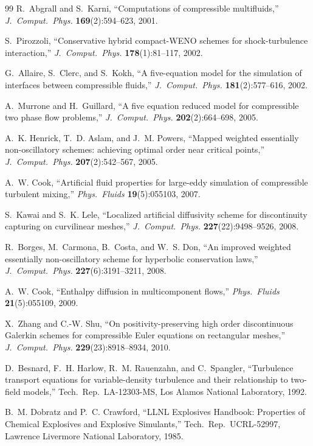 \documentclass[11pt]{article}
\begin{document}
\begin{thebibliography}{99}
R.~Abgrall and S.~Karni,
``Computations of compressible multifluids,''
\textit{J.\ Comput.\ Phys.} \textbf{169}(2):594--623, 2001.

S.~Pirozzoli,
``Conservative hybrid compact-WENO schemes for shock-turbulence interaction,''
\textit{J.\ Comput.\ Phys.} \textbf{178}(1):81--117, 2002.

G.~Allaire, S.~Clerc, and S.~Kokh,
``A five-equation model for the simulation of interfaces between compressible
fluids,''
\textit{J.\ Comput.\ Phys.} \textbf{181}(2):577--616, 2002.

A.~Murrone and H.~Guillard,
``A five equation reduced model for compressible two phase flow problems,''
\textit{J.\ Comput.\ Phys.} \textbf{202}(2):664--698, 2005.

A.~K. Henrick, T.~D. Aslam, and J.~M. Powers,
``Mapped weighted essentially non-oscillatory schemes: achieving optimal order
near critical points,''
\textit{J.\ Comput.\ Phys.} \textbf{207}(2):542--567, 2005.

A.~W. Cook,
``Artificial fluid properties for large-eddy simulation of compressible
turbulent mixing,''
\textit{Phys.\ Fluids} \textbf{19}(5):055103, 2007.

S.~Kawai and S.~K. Lele,
``Localized artificial diffusivity scheme for discontinuity capturing on
curvilinear meshes,''
\textit{J.\ Comput.\ Phys.} \textbf{227}(22):9498--9526, 2008.

R.~Borges, M.~Carmona, B.~Costa, and W.~S. Don,
``An improved weighted essentially non-oscillatory scheme for hyperbolic
conservation laws,''
\textit{J.\ Comput.\ Phys.} \textbf{227}(6):3191--3211, 2008.

A.~W. Cook,
``Enthalpy diffusion in multicomponent flows,''
\textit{Phys.\ Fluids} \textbf{21}(5):055109, 2009.

X.~Zhang and C.-W. Shu,
``On positivity-preserving high order discontinuous Galerkin schemes for
compressible Euler equations on rectangular meshes,''
\textit{J.\ Comput.\ Phys.} \textbf{229}(23):8918--8934, 2010.

D.~Besnard, F.~H. Harlow, R.~M. Rauenzahn, and C.~Spangler,
``Turbulence transport equations for variable-density turbulence and their
relationship to two-field models,''
Tech.\ Rep.\ LA-12303-MS, Los Alamos National Laboratory, 1992.

B.~M. Dobratz and P.~C. Crawford,
``LLNL Explosives Handbook: Properties of Chemical Explosives and Explosive
Simulants,''
Tech.\ Rep.\ UCRL-52997, Lawrence Livermore National Laboratory, 1985.

\end{thebibliography}
\end{document}
